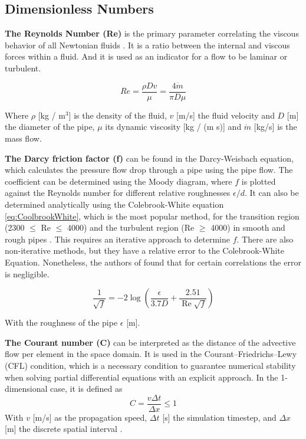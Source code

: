 \subsection{Dimensionless Numbers}
\textbf{The Reynolds Number (Re)} is the primary parameter correlating the viscous behavior of all Newtonian fluids \cite{white2011fluid}. It is a ratio between the internal and viscous forces within a fluid. And it is used as an indicator for a flow to be laminar or turbulent. 

\begin{equation}\label{eq::Re}
R e=\frac{\rho D v}{\mu}=\frac{4 \dot{m}}{\pi D \mu}
\end{equation}

Where $\rho$ [kg / m$^3$] is the density of the fluid, $v$ [m/s] the fluid velocity and $D$ [m] the diameter of the pipe, $\mu$ its dynamic viscosity [kg / (m s)] and $\dot{m}$ [kg/s] is the mass flow. 

\textbf{The Darcy friction factor (f)} can be found in the Darcy-Weisbach equation, which calculates the pressure flow drop through a pipe using the pipe flow. The coefficient can be determined using the Moody diagram, where $f$ is plotted against the Reynolds number for different relative roughnesses $\epsilon / d$. It can also be determined analytically using the Colebrook-White equation \ref{eq:CoolbrookWhite}, which is the most popular method, for the transition region (2300 $\leq$ Re $\leq$ 4000) and the turbulent region (Re $\geq$ 4000) in smooth and rough pipes \cite{Darcyfrictionfactor}. This requires an iterative approach to determine $f$. There are also non-iterative methods, but they have a relative error to the Colebrook-White Equation. Nonetheless, the authors of \cite{Darcyfrictionfactor} found that for certain correlations the error is negligible.

\begin{equation}\label{eq:CoolbrookWhite}
\frac{1}{\sqrt{f}}=-2 \log \left(\frac{\epsilon}{3.7 D}+\frac{2.51}{\operatorname{Re} \sqrt{f}}\right)
\end{equation}

With the roughness of the pipe $\epsilon$ [m].

\textbf{The Courant number (C)} can be interpreted as the distance of the advective flow per element in the space domain. It is used in the Courant–Friedrichs–Lewy (CFL) condition, which is a necessary condition to guarantee numerical stability when solving partial differential equations with an explicit approach. In the 1-dimensional case, it is defined as
\begin{equation}
    C = \frac{v \Delta t}{\Delta x} \leq 1
\end{equation}
With $v$ [m/s] as the propagation speed, $\Delta t$ [s] the simulation timestep, and $\Delta x$ [m] the discrete spatial interval \cite{MaxCourant}. 

